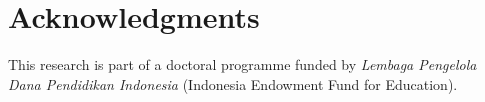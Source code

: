 \documentclass[conference]{IEEEtran}
\begin{document}
%







\section*{Acknowledgments}
This research is part of a doctoral programme funded by \emph{Lembaga Pengelola Dana Pendidikan Indonesia} (Indonesia Endowment Fund for Education).

\end{document}
